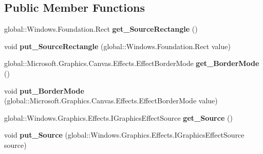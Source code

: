 \subsection*{Public Member Functions}
\begin{DoxyCompactItemize}
\item 
\mbox{\label{interface_microsoft_1_1_graphics_1_1_canvas_1_1_effects_1_1_i_crop_effect_afc0de3bee5f831a8dfac30ecac6a898d}} 
global\+::\+Windows.\+Foundation.\+Rect {\bfseries get\+\_\+\+Source\+Rectangle} ()
\item 
\mbox{\label{interface_microsoft_1_1_graphics_1_1_canvas_1_1_effects_1_1_i_crop_effect_ad88fede8cf2dfab050189939a47de349}} 
void {\bfseries put\+\_\+\+Source\+Rectangle} (global\+::\+Windows.\+Foundation.\+Rect value)
\item 
\mbox{\label{interface_microsoft_1_1_graphics_1_1_canvas_1_1_effects_1_1_i_crop_effect_aedc53db53d8d6e57c40517ab6a3758d0}} 
global\+::\+Microsoft.\+Graphics.\+Canvas.\+Effects.\+Effect\+Border\+Mode {\bfseries get\+\_\+\+Border\+Mode} ()
\item 
\mbox{\label{interface_microsoft_1_1_graphics_1_1_canvas_1_1_effects_1_1_i_crop_effect_ae88c621641cd9be11414409037414d5e}} 
void {\bfseries put\+\_\+\+Border\+Mode} (global\+::\+Microsoft.\+Graphics.\+Canvas.\+Effects.\+Effect\+Border\+Mode value)
\item 
\mbox{\label{interface_microsoft_1_1_graphics_1_1_canvas_1_1_effects_1_1_i_crop_effect_ae17d9daa0439d30e16235dde28fde47d}} 
global\+::\+Windows.\+Graphics.\+Effects.\+I\+Graphics\+Effect\+Source {\bfseries get\+\_\+\+Source} ()
\item 
\mbox{\label{interface_microsoft_1_1_graphics_1_1_canvas_1_1_effects_1_1_i_crop_effect_aad283c62ebd28ad1ba136787595806fa}} 
void {\bfseries put\+\_\+\+Source} (global\+::\+Windows.\+Graphics.\+Effects.\+I\+Graphics\+Effect\+Source source)

\end{DoxyCompactItemize}
